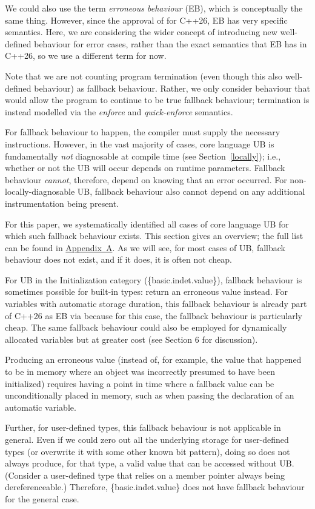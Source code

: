 We could also use the term \emph{erroneous behaviour} (EB), which is conceptually the same thing. However, since the approval of \cite{P2795R5} for C++26, EB has very specific semantics. Here, we are considering the wider concept of introducing new well-defined behaviour for error cases, rather than the exact semantics that EB has in C++26, so we use a different term for now.

Note that we are not counting program termination (even though this also well-defined behaviour) as fallback behaviour. Rather, we only consider behaviour that would allow the program to continue to be true fallback behaviour; termination is instead modelled via the \emph{enforce} and \emph{quick-enforce} semantics.

For fallback behaviour to happen, the compiler must supply the necessary instructions. However, in the vast majority of cases, core language UB is fundamentally \emph{not} diagnosable at compile time (see Section~\ref{locally}); i.e., whether or not the UB will occur depends on runtime parameters. Fallback behaviour \emph{cannot}, therefore, depend on knowing that an error occurred. For non-locally-diagnosable UB, fallback behaviour also cannot depend on any additional instrumentation being present.

For this paper, we systematically identified all cases of core language UB for which such fallback behaviour exists. This section gives an overview; the full list can be found in \hyperref[appendix]{Appendix~A}. As we will see, for most cases of UB, fallback behaviour does not exist, and if it does, it is often not cheap.

For UB in the Initialization category (\{basic.indet.value\}), fallback behaviour is sometimes possible for built-in types: return an erroneous value instead. For variables with automatic storage duration, this fallback behaviour is already part of C++26 as EB via \cite{P2795R5} because for this case, the fallback behaviour is particularly cheap. The same fallback behaviour could also be employed for dynamically allocated variables but at greater cost (see \cite{P2723R1} Section 6 for discussion).

Producing an erroneous value (instead of, for example, the value that happened to be in memory where an object was incorrectly presumed to have been initialized) requires having a point in time where a fallback value can be unconditionally placed in memory, such as when passing the declaration of an automatic variable.

Further, for user-defined types, this fallback behaviour is not applicable in general. Even if we could zero out all the underlying storage for user-defined types (or overwrite it with some other known bit pattern), doing so does not always produce, for that type, a valid value that can be accessed without UB. (Consider a user-defined type that relies on a member pointer always being dereferenceable.) Therefore, \{basic.indet.value\} does not have fallback behaviour for the general case.

